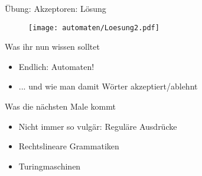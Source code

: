 \begin{frame}{Übung: Akzeptoren: Lösung}
	\begin{figure}
		\centering
		\texttt{[image: automaten/Loesung2.pdf]}
	\end{figure}
\end{frame}

\begin{frame}	
	\begin{block}{Was ihr nun wissen solltet}
		\begin{itemize}
			\item Endlich: Automaten!
			\item ... und wie man damit Wörter akzeptiert/ablehnt
		\end{itemize}
	\end{block}
	
	\begin{block}{Was die nächsten Male kommt}
		\begin{itemize}
			\item Nicht immer so vulgär: Reguläre Ausdrücke
			\item Rechtslineare Grammatiken
			\item Turingmaschinen
		\end{itemize}
	\end{block}
\end{frame}





\slideThanks

